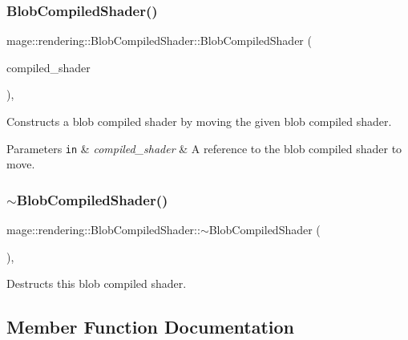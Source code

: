 \subsubsection{\texorpdfstring{Blob\+Compiled\+Shader()}{BlobCompiledShader()}\hspace{0.1cm}{\footnotesize\ttfamily [3/3]}}
{\footnotesize\ttfamily mage\+::rendering\+::\+Blob\+Compiled\+Shader\+::\+Blob\+Compiled\+Shader (\begin{DoxyParamCaption}\item[{\mbox{\hyperlink{classmage_1_1rendering_1_1_blob_compiled_shader}{Blob\+Compiled\+Shader}} \&\&}]{compiled\+\_\+shader }\end{DoxyParamCaption})\hspace{0.3cm}{\ttfamily [default]}, {\ttfamily [noexcept]}}

Constructs a blob compiled shader by moving the given blob compiled shader.


\begin{DoxyParams}[1]{Parameters}
\mbox{\tt in}  & {\em compiled\+\_\+shader} & A reference to the blob compiled shader to move. \\
\hline
\end{DoxyParams}
\mbox{\label{classmage_1_1rendering_1_1_blob_compiled_shader_ac983a2506dfe81e8e8ceb2b9ffa420d6}} 
\subsubsection{\texorpdfstring{$\sim$\+Blob\+Compiled\+Shader()}{~BlobCompiledShader()}}
{\footnotesize\ttfamily mage\+::rendering\+::\+Blob\+Compiled\+Shader\+::$\sim$\+Blob\+Compiled\+Shader (\begin{DoxyParamCaption}{ }\end{DoxyParamCaption})\hspace{0.3cm}{\ttfamily [virtual]}, {\ttfamily [default]}}

Destructs this blob compiled shader. 

\subsection{Member Function Documentation}
\mbox{\label{classmage_1_1rendering_1_1_blob_compiled_shader_a135655e22d372d55c2a3b6ea3e761852}} 
